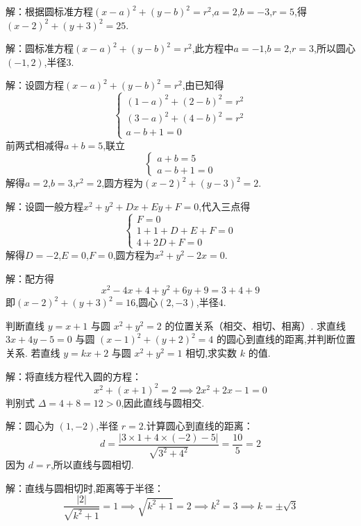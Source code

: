 \documentclass{ctexart}
\newenvironment{MyAnswer}[1][] %
 {\begin{tcolorbox}[breakable, colframe=blue] \begin{Answer}[#1] \color{blue} \kaishu}  %
 {\end{Answer}\end{tcolorbox}}
\begin{document}
\begin{MyAnswer}[ref={ex:circle-properties}]
    \Question 解：根据圆标准方程$(x - a)^2+(y - b)^2 = r^2$,$a = 2$,$b=-3$,$r = 5$,得$(x - 2)^2+(y + 3)^2 = 25$.
    
    \Question 解：圆标准方程$(x - a)^2+(y - b)^2 = r^2$,此方程中$a=-1$,$b = 2$,$r = 3$,所以圆心$(-1,2)$,半径$3$.
    
    \Question 解：设圆方程$(x - a)^2+(y - b)^2 = r^2$,由已知得
    $$
    \begin{cases}
    (1 - a)^2+(2 - b)^2 = r^2 \\
    (3 - a)^2+(4 - b)^2 = r^2 \\
    a - b+1 = 0
    \end{cases}
    $$
    前两式相减得$a + b = 5$,联立
    $$
    \begin{cases}
    a + b = 5 \\
    a - b+1 = 0
    \end{cases}
    $$
    解得$a = 2$,$b = 3$,$r^2 = 2$,圆方程为$(x - 2)^2+(y - 3)^2 = 2$.
    
    \Question 解：设圆一般方程$x^{2}+y^{2}+Dx + Ey+F = 0$,代入三点得
    $$
    \begin{cases}
    F = 0 \\
    1 + 1+D + E+F = 0 \\
    4+2D+F = 0
    \end{cases}
    $$
    解得$D=-2$,$E = 0$,$F = 0$,圆方程为$x^{2}+y^{2}-2x = 0$.
    
    \Question 解：配方得
    $$
    x^{2}-4x + 4+y^{2}+6y+9=3 + 4+9
    $$
    即$(x - 2)^2+(y + 3)^2 = 16$,圆心$(2,-3)$,半径$4$.
\end{MyAnswer}

\clearpage
\begin{Exercise}[title={直线与圆的位置关系小练习}, label={ex:line-circle}]
    \Question 判断直线 $ y = x + 1 $ 与圆 $ x^2 + y^2 = 2 $ 的位置关系（相交、相切、相离）.
    \Question 求直线 $ 3x + 4y - 5 = 0 $ 与圆 $ (x-1)^2 + (y+2)^2 = 4 $ 的圆心到直线的距离,并判断位置关系.
    \Question 若直线 $ y = kx + 2 $ 与圆 $ x^2 + y^2 = 1 $ 相切,求实数 $ k $ 的值.
\end{Exercise}
\begin{MyAnswer}[ref={ex:line-circle}]
        \Question 解：将直线方程代入圆的方程：
        $$
        x^2 + (x + 1)^2 = 2 \implies 2x^2 + 2x - 1 = 0
        $$
        判别式 $ \Delta = 4 + 8 = 12 > 0 $,因此直线与圆相交.

        \Question 解：圆心为 $ (1, -2) $,半径 $ r = 2 $.计算圆心到直线的距离：
        $$
        d = \frac{|3 \times 1 + 4 \times (-2) - 5|}{\sqrt{3^2 + 4^2}} = \frac{10}{5} = 2
        $$
        因为 $ d = r $,所以直线与圆相切.

        \Question 解：直线与圆相切时,距离等于半径：
        $$
        \frac{|2|}{\sqrt{k^2 + 1}} = 1 \implies \sqrt{k^2 + 1} = 2 \implies k^2 = 3 \implies k = \pm \sqrt{3}
        $$
\end{MyAnswer}
\end{document}
